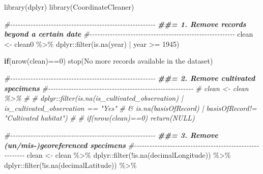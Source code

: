 \documentclass[
]{article}
\newenvironment{Shaded}{\begin{snugshade}}{\end{snugshade}}
\newcommand{\CommentTok}[1]{\textcolor[rgb]{0.56,0.35,0.01}{\textit{#1}}}
\newcommand{\ControlFlowTok}[1]{\textcolor[rgb]{0.13,0.29,0.53}{\textbf{#1}}}
\newcommand{\DecValTok}[1]{\textcolor[rgb]{0.00,0.00,0.81}{#1}}
\newcommand{\DocumentationTok}[1]{\textcolor[rgb]{0.56,0.35,0.01}{\textbf{\textit{#1}}}}
\newcommand{\FunctionTok}[1]{\textcolor[rgb]{0.00,0.00,0.00}{#1}}
\newcommand{\NormalTok}[1]{#1}
\newcommand{\OtherTok}[1]{\textcolor[rgb]{0.56,0.35,0.01}{#1}}
\newcommand{\SpecialCharTok}[1]{\textcolor[rgb]{0.00,0.00,0.00}{#1}}
\newcommand{\StringTok}[1]{\textcolor[rgb]{0.31,0.60,0.02}{#1}}
\begin{document}
\begin{Shaded}
\begin{Highlighting}[]
\FunctionTok{library}\NormalTok{(dplyr)}
\FunctionTok{library}\NormalTok{(CoordinateCleaner)}

\CommentTok{\#{-}{-}{-}{-}{-}{-}{-}{-}{-}{-}{-}{-}{-}{-}{-}{-}{-}{-}{-}{-}{-}{-}{-}{-}{-}{-}{-}{-}{-}{-}{-}{-}{-}{-}{-}{-}{-}{-}{-}{-}{-}{-}{-}{-}{-}{-}{-}{-}{-}{-}{-}{-}{-}{-}{-}{-}{-}}
\DocumentationTok{\#\#= 1. Remove records beyond a certain date}
\CommentTok{\#{-}{-}{-}{-}{-}{-}{-}{-}{-}{-}{-}{-}{-}{-}{-}{-}{-}{-}{-}{-}{-}{-}{-}{-}{-}{-}{-}{-}{-}{-}{-}{-}{-}{-}{-}{-}{-}{-}{-}{-}{-}{-}{-}{-}{-}{-}{-}{-}{-}{-}{-}{-}{-}{-}{-}{-}{-}}
\NormalTok{clean }\OtherTok{\textless{}{-}}\NormalTok{ clean0 }\SpecialCharTok{\%\textgreater{}\%}
\NormalTok{  dplyr}\SpecialCharTok{::}\FunctionTok{filter}\NormalTok{(}\FunctionTok{is.na}\NormalTok{(year) }\SpecialCharTok{|}\NormalTok{ year }\SpecialCharTok{\textgreater{}=} \DecValTok{1945}\NormalTok{)}

\ControlFlowTok{if}\NormalTok{(}\FunctionTok{nrow}\NormalTok{(clean)}\SpecialCharTok{==}\DecValTok{0}\NormalTok{) }\FunctionTok{stop}\NormalTok{(}\StringTok{\textquotesingle{}No more records available in the dataset\textquotesingle{}}\NormalTok{)}

\CommentTok{\#{-}{-}{-}{-}{-}{-}{-}{-}{-}{-}{-}{-}{-}{-}{-}{-}{-}{-}{-}{-}{-}{-}{-}{-}{-}{-}{-}{-}{-}{-}{-}{-}{-}{-}{-}{-}{-}{-}{-}{-}{-}{-}{-}{-}{-}{-}{-}{-}{-}{-}{-}{-}{-}{-}{-}{-}{-}}
\DocumentationTok{\#\#= 2. Remove cultivated specimens}
\CommentTok{\#{-}{-}{-}{-}{-}{-}{-}{-}{-}{-}{-}{-}{-}{-}{-}{-}{-}{-}{-}{-}{-}{-}{-}{-}{-}{-}{-}{-}{-}{-}{-}{-}{-}{-}{-}{-}{-}{-}{-}{-}{-}{-}{-}{-}{-}{-}{-}{-}{-}{-}{-}{-}{-}{-}{-}{-}{-}}
\CommentTok{\# clean \textless{}{-} clean \%\textgreater{}\%}
\CommentTok{\#}
\CommentTok{\#   dplyr::filter(is.na(is\_cultivated\_observation) | is\_cultivated\_observation == "Yes"}
\CommentTok{\#                 \& is.na(basisOfRecord) | basisOfRecord!= "Cultivated habitat")}
\CommentTok{\#}
\CommentTok{\# if(nrow(clean)==0) return(NULL)}

\CommentTok{\#{-}{-}{-}{-}{-}{-}{-}{-}{-}{-}{-}{-}{-}{-}{-}{-}{-}{-}{-}{-}{-}{-}{-}{-}{-}{-}{-}{-}{-}{-}{-}{-}{-}{-}{-}{-}{-}{-}{-}{-}{-}{-}{-}{-}{-}{-}{-}{-}{-}{-}{-}{-}{-}{-}{-}{-}{-}}
\DocumentationTok{\#\#= 3. Remove (un/mis{-})georeferenced specimens}
\CommentTok{\#{-}{-}{-}{-}{-}{-}{-}{-}{-}{-}{-}{-}{-}{-}{-}{-}{-}{-}{-}{-}{-}{-}{-}{-}{-}{-}{-}{-}{-}{-}{-}{-}{-}{-}{-}{-}{-}{-}{-}{-}{-}{-}{-}{-}{-}{-}{-}{-}{-}{-}{-}{-}{-}{-}{-}{-}{-}}
\NormalTok{clean }\OtherTok{\textless{}{-}}\NormalTok{ clean }\SpecialCharTok{\%\textgreater{}\%}
\NormalTok{  dplyr}\SpecialCharTok{::}\FunctionTok{filter}\NormalTok{(}\SpecialCharTok{!}\FunctionTok{is.na}\NormalTok{(decimalLongitude)) }\SpecialCharTok{\%\textgreater{}\%}
\NormalTok{  dplyr}\SpecialCharTok{::}\FunctionTok{filter}\NormalTok{(}\SpecialCharTok{!}\FunctionTok{is.na}\NormalTok{(decimalLatitude)) }\SpecialCharTok{\%\textgreater{}\%}


\end{Highlighting}
\end{Shaded}
\end{document}

